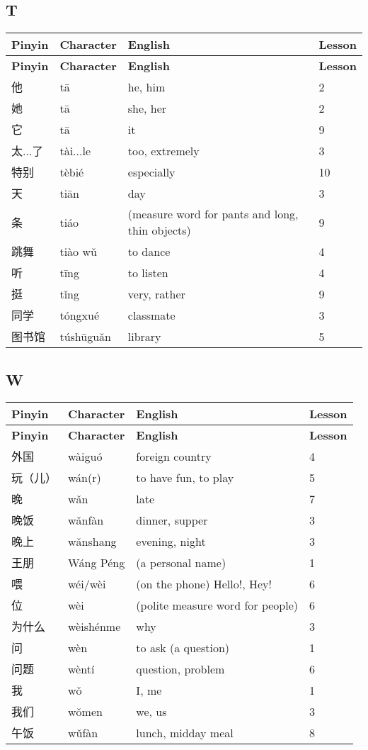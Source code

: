 \documentclass[12pt]{article}
\newcommand{\vocabitem}[4]{%
  #1 & #2 & #3 & #4 \\ \midrule
}
\begin{document}
\subsection*{T}
\begin{longtable}{P{\dimexpr\textwidth/4\relax}P{\dimexpr\textwidth/4\relax}P{\dimexpr\textwidth/4\relax}P{\dimexpr\textwidth/4\relax}}
\toprule
\textbf{Pinyin} & \textbf{Character} & \textbf{English} & \textbf{Lesson} \\
\midrule
\endfirsthead
\toprule
\textbf{Pinyin} & \textbf{Character} & \textbf{English} & \textbf{Lesson} \\
\midrule
\endhead
\vocabitem{他}{tā}{he, him}{2}
\vocabitem{她}{tā}{she, her}{2}
\vocabitem{它}{tā}{it}{9}
\vocabitem{太...了}{tài...le}{too, extremely}{3}
\vocabitem{特别}{tèbié}{especially}{10}
\vocabitem{天}{tiān}{day}{3}
\vocabitem{条}{tiáo}{(measure word for pants and long, thin objects)}{9}
\vocabitem{跳舞}{tiào wǔ}{to dance}{4}
\vocabitem{听}{tīng}{to listen}{4}
\vocabitem{挺}{tǐng}{very, rather}{9}
\vocabitem{同学}{tóngxué}{classmate}{3}
\vocabitem{图书馆}{túshūguǎn}{library}{5}
\end{longtable}

\subsection*{W}
\begin{longtable}{P{\dimexpr\textwidth/4\relax}P{\dimexpr\textwidth/4\relax}P{\dimexpr\textwidth/4\relax}P{\dimexpr\textwidth/4\relax}}
\toprule
\textbf{Pinyin} & \textbf{Character} & \textbf{English} & \textbf{Lesson} \\
\midrule
\endfirsthead
\toprule
\textbf{Pinyin} & \textbf{Character} & \textbf{English} & \textbf{Lesson} \\
\midrule
\endhead
\vocabitem{外国}{wàiguó}{foreign country}{4}
\vocabitem{玩（儿）}{wán(r)}{to have fun, to play}{5}
\vocabitem{晚}{wǎn}{late}{7}
\vocabitem{晚饭}{wǎnfàn}{dinner, supper}{3}
\vocabitem{晚上}{wǎnshang}{evening, night}{3}
\vocabitem{王朋}{Wáng Péng}{(a personal name)}{1}
\vocabitem{喂}{wéi/wèi}{(on the phone) Hello!, Hey!}{6}
\vocabitem{位}{wèi}{(polite measure word for people)}{6}
\vocabitem{为什么}{wèishénme}{why}{3}
\vocabitem{问}{wèn}{to ask (a question)}{1}
\vocabitem{问题}{wèntí}{question, problem}{6}
\vocabitem{我}{wǒ}{I, me}{1}
\vocabitem{我们}{wǒmen}{we, us}{3}
\vocabitem{午饭}{wǔfàn}{lunch, midday meal}{8}
\end{longtable}
\end{document}
